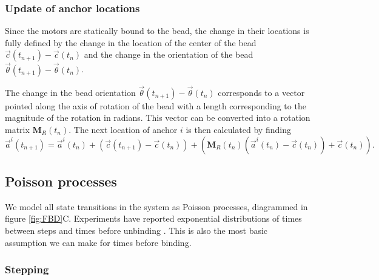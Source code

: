 \subsubsection*{Update of anchor locations}

Since the motors are statically bound to the bead, the change in their locations is fully defined by the change in the location of the center of the bead $\vec{c}(t_{n+1})-\vec{c}(t_n)$ and the change in the orientation of the bead $\vec{\theta}(t_{n+1}) - \vec{\theta}(t_n)$.

The change in the bead orientation $\vec{\theta}(t_{n+1}) - \vec{\theta}(t_n)$ corresponds to a vector pointed along the axis of rotation of the bead with a length corresponding to the magnitude of the rotation in radians. This vector can be converted into a rotation matrix $\mathbf{M}_R(t_n)$. The next location of anchor $i$ is then calculated by finding
\begin{equation} \label{eq:anchor_update}
\vec{a}^i(t_{n+1})=\vec{a}^i(t_n) + \left( \vec{c}(t_{n+1})-\vec{c}(t_n) \right) + 
\left( \mathbf{M}_R(t_n) \left( \vec{a}^i(t_n) - \vec{c}(t_n) \right) + \vec{c}(t_n) \right).
\end{equation}

\subsection{Poisson processes}


We model all state transitions in the system as Poisson processes, diagrammed in figure \ref{fig:FBD}C. Experiments have reported exponential distributions of times between steps \cite{Carter2005} and times before unbinding \cite{Kunwar2011}. This is also the most basic assumption we can make for times before binding.


\subsubsection*{Stepping}

